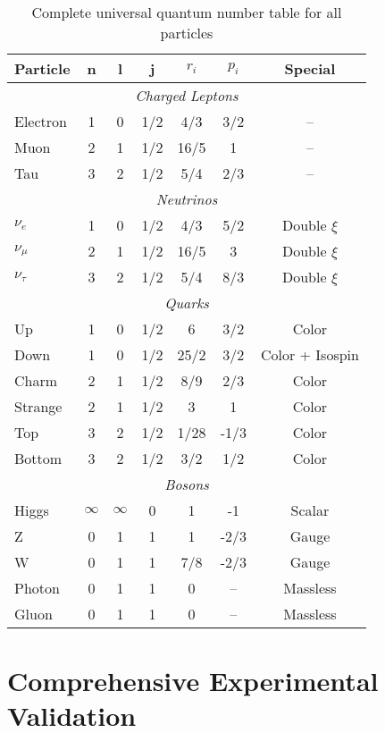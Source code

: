 \documentclass[12pt,a4paper]{article}
\begin{document}
	\begin{table}[H]
		\centering
		\begin{tabular}{lcccccc}
			\toprule
			\textbf{Particle} & \textbf{n} & \textbf{l} & \textbf{j} & \textbf{$r_i$} & \textbf{$p_i$} & \textbf{Special} \\
			\midrule
			\multicolumn{7}{c}{\textit{Charged Leptons}} \\
			\midrule
			Electron & 1 & 0 & 1/2 & 4/3 & 3/2 & -- \\
			Muon & 2 & 1 & 1/2 & 16/5 & 1 & -- \\
			Tau & 3 & 2 & 1/2 & 5/4 & 2/3 & -- \\
			\midrule
			\multicolumn{7}{c}{\textit{Neutrinos}} \\
			\midrule
			$\nu_e$ & 1 & 0 & 1/2 & 4/3 & 5/2 & Double $\xi$ \\
			$\nu_\mu$ & 2 & 1 & 1/2 & 16/5 & 3 & Double $\xi$ \\
			$\nu_\tau$ & 3 & 2 & 1/2 & 5/4 & 8/3 & Double $\xi$ \\
			\midrule
			\multicolumn{7}{c}{\textit{Quarks}} \\
			\midrule
			Up & 1 & 0 & 1/2 & 6 & 3/2 & Color \\
			Down & 1 & 0 & 1/2 & 25/2 & 3/2 & Color + Isospin \\
			Charm & 2 & 1 & 1/2 & 8/9 & 2/3 & Color \\
			Strange & 2 & 1 & 1/2 & 3 & 1 & Color \\
			Top & 3 & 2 & 1/2 & 1/28 & -1/3 & Color \\
			Bottom & 3 & 2 & 1/2 & 3/2 & 1/2 & Color \\
			\midrule
			\multicolumn{7}{c}{\textit{Bosons}} \\
			\midrule
			Higgs & $\infty$ & $\infty$ & 0 & 1 & -1 & Scalar \\
			Z & 0 & 1 & 1 & 1 & -2/3 & Gauge \\
			W & 0 & 1 & 1 & 7/8 & -2/3 & Gauge \\
			Photon & 0 & 1 & 1 & 0 & -- & Massless \\
			Gluon & 0 & 1 & 1 & 0 & -- & Massless \\
			\bottomrule
		\end{tabular}
		\caption{Complete universal quantum number table for all particles}
		\label{tab:universal_quantum_numbers}
	\end{table}
	
	\section{Comprehensive Experimental Validation}
	\label{sec:comprehensive_validation}
	
\end{document}

